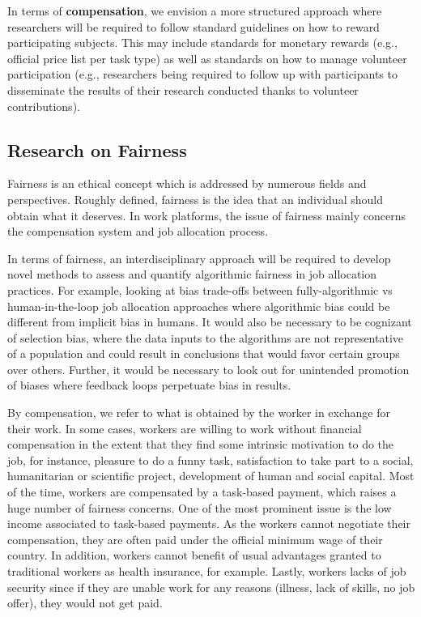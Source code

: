\documentclass[11pt]{article}
\begin{document}
In terms of \textbf{compensation}, we envision a more structured approach where researchers will be required to follow standard guidelines on how to reward participating subjects. This may include standards for monetary rewards (e.g., official price list per task type) as well as standards on how to manage volunteer participation (e.g., researchers being required to follow up with participants to disseminate the results of their research conducted thanks to volunteer contributions).

\subsection{Research on Fairness}
Fairness is an ethical concept which is addressed by numerous fields and perspectives. Roughly defined, fairness is the idea that an individual should obtain what it deserves. In work platforms, the issue of fairness mainly concerns the compensation system and job allocation process.


In terms of fairness, an interdisciplinary approach will be required to develop novel methods to assess and quantify algorithmic fairness in job allocation practices. For example, looking at bias trade-offs between fully-algorithmic vs human-in-the-loop job allocation approaches where algorithmic bias could be different from implicit bias in humans. It would also be necessary to be cognizant of selection bias, where the data inputs to the algorithms are not representative of a population and could result in conclusions that would favor certain groups over others. Further, it would be necessary to look out for unintended promotion of biases where feedback loops perpetuate bias in results.  

By compensation, we refer to what is obtained by the worker in exchange for their work. In some cases, workers are willing to work without financial compensation in the extent that they find some intrinsic motivation to do the job, for instance, pleasure to do a funny task, satisfaction to take part to a social, humanitarian or scientific project, development of human and social capital. Most of the time, workers are compensated by a task-based payment, which raises a huge number of fairness concerns. One of the most prominent issue is the low income associated to task-based payments. As the workers cannot negotiate their compensation, they are often paid under the official minimum wage of their country. In addition, workers cannot benefit of usual advantages granted to traditional workers as health insurance, for example. Lastly, workers lacks of job security since if they are unable work for any reasons (illness, lack of skills, no job offer), they would not get paid. 
\end{document}
